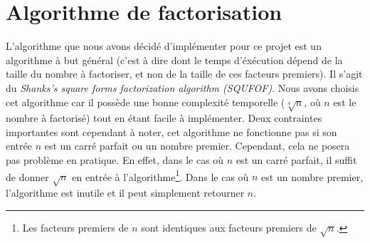 \documentclass{scrartcl}
\begin{document}
\section{Algorithme de factorisation}
L'algorithme que nous avons décidé d'implémenter pour ce projet
est un algorithme à but général (c'est à dire dont le temps
d'éxécution dépend de la taille du nombre à factoriser, et
non de la taille de ces facteurs premiers). Il s'agit du
\textit{Shanks's square forms factorization algorithm (SQUFOF)}.
Nous avons choisis cet algorithme car il possède une bonne
complexité temporelle ($\sqrt[4]{n}$, où $n$ est le nombre à
factorisé) tout en étant facile à implémenter. Deux contraintes
importantes sont cependant à noter, cet algorithme ne fonctionne
pas si son entrée $n$ est un carré parfait ou un nombre premier. 
Cependant, cela ne posera pas problème en pratique.
En effet, dans le cas où $n$ est un carré parfait, il suffit de
donner $\sqrt{n}$ en entrée à l'algorithme\footnote{Les facteurs
premiers de $n$ sont identiques aux facteurs premiers de $\sqrt{n}$.}.
Dans le cas où $n$ est un nombre premier, l'algorithme est inutile
et il peut simplement retourner $n$.



\end{document}
